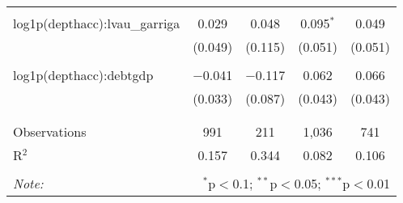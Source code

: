 \documentclass[]{article}
\begin{document}
\begin{table}[!htbp]
\begin{tabular}{@{\extracolsep{5pt}}lcccc}
  & & & & \\ 
 log1p(depthacc):lvau\_garriga & 0.029 & 0.048 & 0.095$^{*}$ & 0.049 \\ 
  & (0.049) & (0.115) & (0.051) & (0.051) \\ 
  & & & & \\ 
 log1p(depthacc):debtgdp & $-$0.041 & $-$0.117 & 0.062 & 0.066 \\ 
  & (0.033) & (0.087) & (0.043) & (0.043) \\ 
  & & & & \\ 
\hline \\[-1.8ex] 
Observations & 991 & 211 & 1,036 & 741 \\ 
R$^{2}$ & 0.157 & 0.344 & 0.082 & 0.106 \\ 
\hline 
\hline \\[-1.8ex] 
\textit{Note:}  & \multicolumn{4}{r}{$^{*}$p$<$0.1; $^{**}$p$<$0.05; $^{***}$p$<$0.01} \\ 
\end{tabular} 
\end{table}
\end{document}
